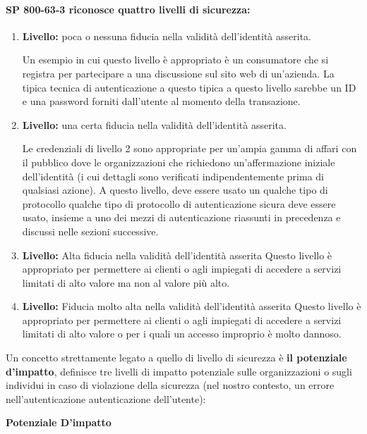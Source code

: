 \paragraph{SP 800-63-3 riconosce quattro livelli di sicurezza:}
\begin{enumerate}
    \item \textbf{Livello:} poca o nessuna fiducia nella validità dell'identità asserita.
    
Un esempio in cui questo livello è appropriato è un consumatore che si registra per partecipare a una discussione sul sito web di un'azienda. La tipica tecnica di autenticazione a questo tipica a questo livello sarebbe un ID e una password forniti dall'utente al momento della transazione.
    
    \item \textbf{Livello:} una certa fiducia nella validità dell'identità asserita.

Le credenziali di livello 2 sono appropriate per un'ampia gamma di affari con il pubblico dove le organizzazioni che richiedono un'affermazione iniziale dell'identità (i cui dettagli sono verificati indipendentemente prima di qualsiasi azione). A questo livello, deve essere usato un qualche tipo di protocollo qualche tipo di protocollo di autenticazione sicura deve essere usato, insieme a uno dei mezzi di autenticazione riassunti in precedenza e discussi nelle sezioni successive.

    \item \textbf{Livello:} Alta fiducia nella validità dell'identità asserita
Questo livello è appropriato per permettere ai clienti o agli impiegati di accedere a servizi limitati di alto valore ma non al valore più alto.


    \item\textbf{Livello:} Fiducia molto alta nella validità dell'identità asserita
Questo livello è appropriato per permettere ai clienti o agli impiegati di accedere a servizi limitati di alto valore o per i quali un accesso improprio è molto dannoso.
\end{enumerate}

Un concetto strettamente legato a quello di livello di sicurezza è \textbf{il potenziale d'impatto}, definisce tre livelli di impatto potenziale sulle organizzazioni o sugli individui in caso di violazione della sicurezza (nel nostro contesto, un errore nell'autenticazione autenticazione dell'utente):

\begin{center}
    \textbf{Potenziale D'impatto}
\end{center}

